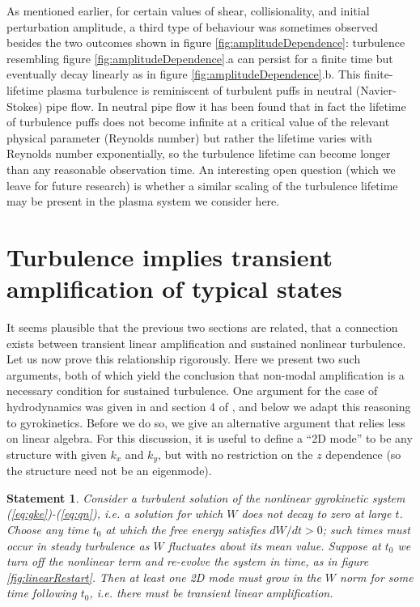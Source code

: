 \documentclass{jpp}
\newtheorem{statement}{Statement}
\begin{document}
As mentioned earlier, for certain values of shear, collisionality, and
initial perturbation amplitude, a third type of behaviour was sometimes
observed besides the two outcomes shown in figure
\ref{fig:amplitudeDependence}: turbulence resembling figure
\ref{fig:amplitudeDependence}.a can persist for a finite time but
eventually decay linearly as in figure
\ref{fig:amplitudeDependence}.b.  This finite-lifetime plasma
turbulence is reminiscent of turbulent puffs in neutral
(Navier-Stokes) pipe flow.  In neutral pipe flow it has been found
\citep{Hof2006, Tel} that in fact the lifetime of turbulence puffs does
not become infinite at a critical value of the relevant physical
parameter (Reynolds number) but rather the lifetime varies with
Reynolds number exponentially, so the turbulence lifetime can become
longer than any reasonable observation time.  An interesting open
question (which we leave for future research) is whether a similar
scaling of the turbulence lifetime may be present in the plasma system
we consider here.


\section{Turbulence implies transient amplification of typical states}
\label{sec:proof}

It seems plausible that the previous two sections are related, that a
connection exists between transient linear amplification and sustained
nonlinear turbulence.  Let us now prove this relationship rigorously.
Here we present two such arguments, both of which yield the conclusion
that non-modal amplification is a necessary condition for sustained
turbulence.  One argument for the case of hydrodynamics was given in
\citet{DelSoleNecessity} and section 4 of \citet{DelSoleSurvey}, and
below we adapt this reasoning to gyrokinetics.  Before we do so, we
give an alternative argument that relies less on linear algebra.  For
this discussion, it is useful to define a ``2D mode'' to be any
structure with given $k_x$ and $k_y$, but with no restriction on the
$z$ dependence (so the structure need not be an eigenmode).

\begin{statement}
Consider a turbulent solution of the nonlinear gyrokinetic system (\ref{eq:gke})-(\ref{eq:qn}),
i.e. a solution for which $W$ does not decay to zero at large $t$.
Choose any time $t_0$ at which the free energy satisfies $dW/dt>0$;
such times must occur in steady turbulence as $W$ fluctuates about its mean value.
Suppose at $t_0$ we turn off the nonlinear term
and re-evolve the system in time, as in figure \ref{fig:linearRestart}.
Then at least one 2D mode must grow in the $W$ norm
for some time following $t_0$, i.e. there must be transient linear amplification.
\end{statement}
\end{document}
